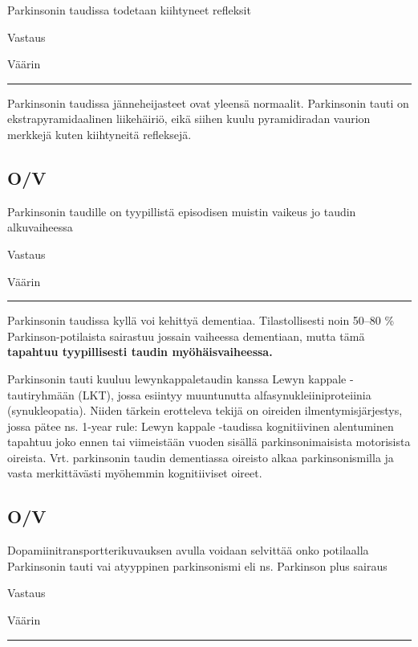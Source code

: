 \documentclass[
]{book}
\begin{document}
Parkinsonin taudissa todetaan kiihtyneet refleksit

Vastaus

Väärin

\begin{center}\rule{0.5\linewidth}{0.5pt}\end{center}

Parkinsonin taudissa jänneheijasteet ovat yleensä normaalit. Parkinsonin tauti on ekstrapyramidaalinen liikehäiriö, eikä siihen kuulu pyramidiradan vaurion merkkejä kuten kiihtyneitä refleksejä.

\subsection{O/V}\label{ov-12}

Parkinsonin taudille on tyypillistä episodisen muistin vaikeus jo taudin alkuvaiheessa

Vastaus

Väärin

\begin{center}\rule{0.5\linewidth}{0.5pt}\end{center}

Parkinsonin taudissa kyllä voi kehittyä dementiaa. Tilastollisesti noin 50--80 \% Parkinson-potilaista sairastuu jossain vaiheessa dementiaan, mutta tämä \textbf{tapahtuu tyypillisesti taudin myöhäisvaiheessa.}

Parkinsonin tauti kuuluu lewynkappaletaudin kanssa Lewyn kappale -tautiryhmään (LKT), jossa esiintyy muuntunutta alfasynukleiiniproteiinia (synukleopatia). Niiden tärkein erotteleva tekijä on oireiden ilmentymisjärjestys, jossa pätee ns. 1-year rule: Lewyn kappale -taudissa kognitiivinen alentuminen tapahtuu joko ennen tai viimeistään vuoden sisällä parkinsonimaisista motorisista oireista. Vrt. parkinsonin taudin dementiassa oireisto alkaa parkinsonismilla ja vasta merkittävästi myöhemmin kognitiiviset oireet.

\subsection{O/V}\label{ov-13}

Dopamiinitransportterikuvauksen avulla voidaan selvittää onko potilaalla Parkinsonin tauti vai atyyppinen parkinsonismi eli ns. Parkinson plus sairaus

Vastaus

Väärin

\begin{center}\rule{0.5\linewidth}{0.5pt}\end{center}
\end{document}
